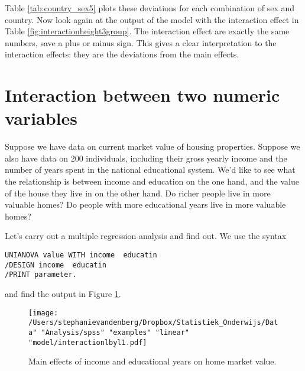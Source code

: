Table \ref{tab:country_sex5} plots these deviations for each combination of sex and country. Now look again at the output of the model with the interaction effect in Table \ref{fig:interactionheight3group}. The interaction effect are exactly the same numbers, save a plus or minus sign. This gives a clear interpretation to the interaction effects: they are the deviations from the main effects. 










\section{Interaction between two numeric variables}

Suppose we have data on current market value of housing properties. Suppose we also have data on 200 individuals, including their gross yearly income and the number of years spent in the national educational system. We'd like to see what the relationship is between income and education on the one hand, and the value of the house they live in on the other hand. Do richer people live in more valuable homes? Do people with more educational years live in more valuable homes? 

\begin{kframe}


{\ttfamily\noindent\bfseries{}}

{\ttfamily\noindent\bfseries{}}\end{kframe}


Let's carry out a multiple regression analysis and find out. We use the syntax

\begin{verbatim}
UNIANOVA value WITH income  educatin
/DESIGN income  educatin 
/PRINT parameter.
\end{verbatim}

and find the output in Figure \ref{fig:interactionlbyl1}. 

\begin{figure}[h]
    \begin{center}
       \texttt{[image: /Users/stephanievandenberg/Dropbox/Statistiek\_Onderwijs/Data" "Analysis/spss" "examples"  "linear" "model/interactionlbyl1.pdf]}
    \end{center}
    \caption{Main effects of income and educational years on home market value.}
    \label{fig:interactionlbyl1}
\end{figure}

